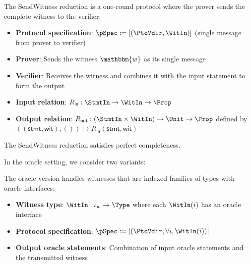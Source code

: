 \begin{definition}
    \label{def:sendwitness_reduction}
    The SendWitness reduction is a one-round protocol where the prover sends the complete witness to the verifier:
    \begin{itemize}
        \item \textbf{Protocol specification}: $\pSpec := [(\PtoVdir, \WitIn)]$ (single message from prover to verifier)
        \item \textbf{Prover}: Sends the witness $\mathbbm{w}$ as its single message
        \item \textbf{Verifier}: Receives the witness and combines it with the input statement to form the output
        \item \textbf{Input relation}: $R_{\mathsf{in}} : \StmtIn \to \WitIn \to \Prop$
        \item \textbf{Output relation}: $R_{\mathsf{out}} : (\StmtIn \times \WitIn) \to \Unit \to \Prop$ defined by $((\mathsf{stmt}, \mathsf{wit}), ()) \mapsto R_{\mathsf{in}}(\mathsf{stmt}, \mathsf{wit})$
    \end{itemize}
\end{definition}

\begin{theorem}
    The SendWitness reduction satisfies perfect completeness.
\end{theorem}

In the oracle setting, we consider two variants:

\begin{definition}
    \label{def:sendwitness_oracle_reduction}
    The oracle version handles witnesses that are indexed families of types with oracle interfaces:
    \begin{itemize}
        \item \textbf{Witness type}: $\WitIn : \iota_w \to \Type$ where each $\WitIn(i)$ has an oracle interface
        \item \textbf{Protocol specification}: $\pSpec := [(\PtoVdir, \forall i, \WitIn(i))]$
        \item \textbf{Output oracle statements}: Combination of input oracle statements and the transmitted witness
    \end{itemize}
\end{definition}


